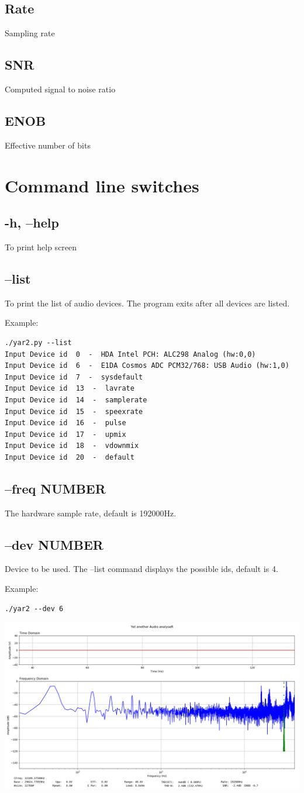\documentclass[10pt,a4paper]{article}
\begin{document}
\subsection{Rate}
Sampling rate
\subsection{SNR}
Computed signal to noise ratio
\subsection{ENOB}
Effective number of bits
\section{Command line switches}
\subsection{-h, --help}
To print help screen
\subsection{--list}
To print the list of audio devices. The program exits after all devices are listed.

Example:
\begin{verbatim}
./yar2.py --list
Input Device id  0  -  HDA Intel PCH: ALC298 Analog (hw:0,0)
Input Device id  6  -  E1DA Cosmos ADC PCM32/768: USB Audio (hw:1,0)
Input Device id  7  -  sysdefault
Input Device id  13  -  lavrate
Input Device id  14  -  samplerate
Input Device id  15  -  speexrate
Input Device id  16  -  pulse
Input Device id  17  -  upmix
Input Device id  18  -  vdownmix
Input Device id  20  -  default
\end{verbatim}
\subsection{--freq NUMBER}
The hardware sample rate, default is 192000Hz.
\subsection{--dev NUMBER}
Device to be used. The --list command displays the possible ids, default is 4.

Example:
\begin{verbatim}
./yar2 --dev 6
\end{verbatim}
\includegraphics[width=\textwidth]{noise.png}
\end{document}
